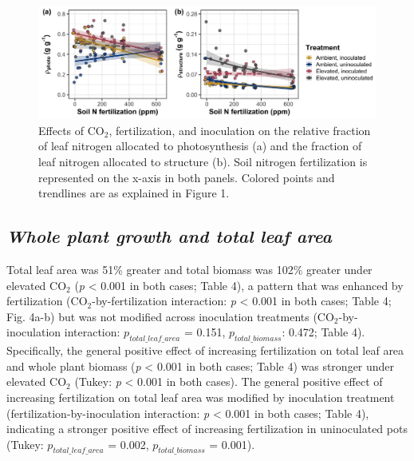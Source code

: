 \newpage
\begin{landscape}
    \begin{figure}
        \centering
        \includegraphics[scale = 0.075]{ch5_NxCO2xI/figs/NxCO2xI_fig3_propN.png}
        \caption[Effects of CO$_2$, fertilization, and inoculation on the relative fraction of leaf nitrogen allocated to photosynthesis and the fraction of leaf nitrogen allocated to structure.]{Effects of CO$_2$, fertilization, and inoculation on the relative fraction of leaf nitrogen allocated to photosynthesis (a) and the fraction of leaf nitrogen allocated to structure (b). Soil nitrogen fertilization is represented on the x-axis in both panels. Colored points and trendlines are as explained in Figure 1.}
        \label{fig:figure5.3}
    \end{figure}
\end{landscape}
\clearpage

\subsection{\textit{Whole plant growth and total leaf area}}
Total leaf area was 51\% greater and total biomass was 102\% greater under elevated CO$_2$ (\textit{p} < 0.001 in both cases; Table 4), a pattern that was enhanced by fertilization (CO$_2$-by-fertilization interaction: \textit{p} < 0.001 in both cases; Table 4; Fig. 4a-b) but was not modified across inoculation treatments (CO$_2$-by-inoculation interaction: $p_{total\_leaf\_area}$ = 0.151, $p_{total\_biomass}$: 0.472; Table 4). Specifically, the general positive effect of increasing fertilization on total leaf area and whole plant biomass (\textit{p} < 0.001 in both cases; Table 4) was stronger under elevated CO$_2$ (Tukey: \textit{p} < 0.001 in both cases). The general positive effect of increasing fertilization on total leaf area was modified by inoculation treatment (fertilization-by-inoculation interaction: \textit{p} < 0.001 in both cases; Table 4), indicating a stronger positive effect of increasing fertilization in uninoculated pots (Tukey: $p_{total\_leaf\_area}$ = 0.002, $p_{total\_biomass}$ = 0.001).

